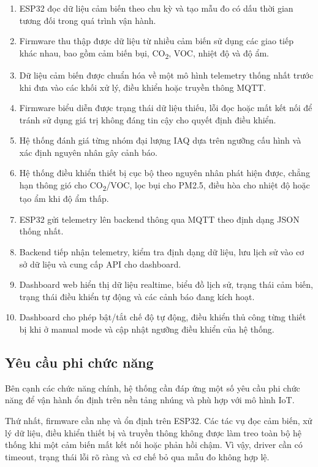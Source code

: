 \begin{enumerate}[leftmargin=2em]
    \item ESP32 đọc dữ liệu cảm biến theo chu kỳ và tạo mẫu đo có dấu thời gian tương
    đối trong quá trình vận hành.
    \item Firmware thu thập được dữ liệu từ nhiều cảm biến sử dụng các giao tiếp khác
    nhau, bao gồm cảm biến bụi, CO\textsubscript{2}, VOC, nhiệt độ và độ ẩm.
    \item Dữ liệu cảm biến được chuẩn hóa về một mô hình telemetry thống nhất trước khi
    đưa vào các khối xử lý, điều khiển hoặc truyền thông MQTT.
    \item Firmware biểu diễn được trạng thái dữ liệu thiếu, lỗi đọc hoặc mất kết nối để
    tránh sử dụng giá trị không đáng tin cậy cho quyết định điều khiển.
    \item Hệ thống đánh giá từng nhóm đại lượng IAQ dựa trên ngưỡng cấu hình và xác
    định nguyên nhân gây cảnh báo.
    \item Hệ thống điều khiển thiết bị cục bộ theo nguyên nhân phát hiện được, chẳng
    hạn thông gió cho CO\textsubscript{2}/VOC, lọc bụi cho PM2.5, điều hòa cho nhiệt
    độ hoặc tạo ẩm khi độ ẩm thấp.
    \item ESP32 gửi telemetry lên backend thông qua MQTT theo định dạng JSON thống nhất.
    \item Backend tiếp nhận telemetry, kiểm tra định dạng dữ liệu, lưu lịch sử vào cơ sở
    dữ liệu và cung cấp API cho dashboard.
    \item Dashboard web hiển thị dữ liệu realtime, biểu đồ lịch sử, trạng thái cảm biến,
    trạng thái điều khiển tự động và các cảnh báo đang kích hoạt.
    \item Dashboard cho phép bật/tắt chế độ tự động, điều khiển thủ công từng thiết bị
    khi ở manual mode và cập nhật ngưỡng điều khiển của hệ thống.
\end{enumerate}

\subsection{Yêu cầu phi chức năng}

Bên cạnh các chức năng chính, hệ thống cần đáp ứng một số yêu cầu phi chức năng để vận
hành ổn định trên nền tảng nhúng và phù hợp với mô hình IoT.

Thứ nhất, firmware cần nhẹ và ổn định trên ESP32. Các tác vụ đọc cảm biến, xử lý dữ
liệu, điều khiển thiết bị và truyền thông không được làm treo toàn bộ hệ thống khi một
cảm biến mất kết nối hoặc phản hồi chậm. Vì vậy, driver cần có timeout, trạng thái lỗi
rõ ràng và cơ chế bỏ qua mẫu đo không hợp lệ.

